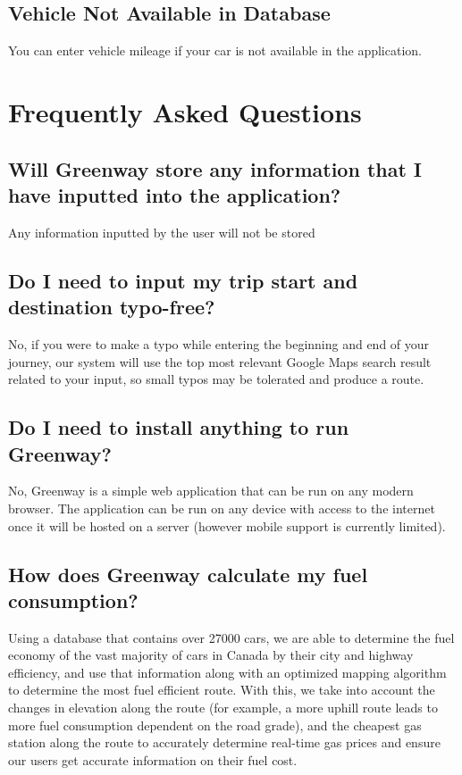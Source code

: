 \documentclass[12pt, titlepage]{article}
\begin{document}
\subsection{Vehicle Not Available in Database}
You can enter vehicle mileage if your car is not available in the application. 

\section{Frequently Asked Questions}

\subsection{Will Greenway store any information that I have inputted into the application?}
Any information inputted by the user will not be stored 

\subsection{Do I need to input my trip start and destination typo-free?}
No, if you were to make a typo while entering the beginning and end of your journey, our system will use the top most relevant Google Maps search result related to your input, so small typos may be tolerated and produce a route.

\subsection{Do I need to install anything to run Greenway?}
No, Greenway is a simple web application that can be run on any modern browser. The application can be run on any device with access to the internet once it will be hosted on a server (however mobile support is currently limited).

\subsection{How does Greenway calculate my fuel consumption?}
Using a database that contains over 27000 cars, we are able to determine the fuel economy of the vast majority of cars in Canada by their city and highway efficiency, and use that information along with an optimized mapping algorithm to determine the most fuel efficient route. With this, we take into account the changes in elevation along the route (for example, a more uphill route leads to more fuel consumption dependent on the road grade), and the cheapest gas station along the route to accurately determine real-time gas prices and ensure our users get accurate information on their fuel cost.
\end{document}

